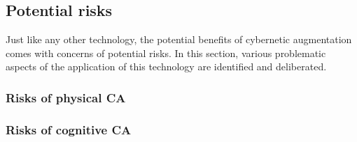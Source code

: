 \subsection{Potential risks}
Just like any other technology, the potential benefits of cybernetic augmentation comes with concerns of potential risks. In this section, various problematic aspects of the application of this technology are identified and deliberated.

\subsubsection{Risks of physical CA}


\subsubsection{Risks of cognitive CA}
